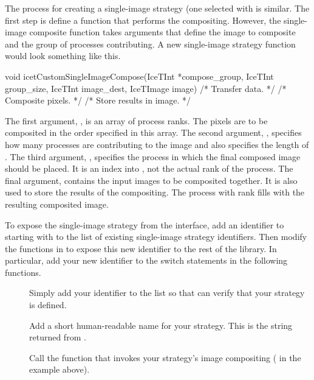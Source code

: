 The process for creating a single-image strategy (one selected with
 is similar.  The first step is define a
function that performs the compositing.  However, the single-image
composite function takes arguments that define the image to composite and
the group of processes contributing.  A new single-image strategy function
would look something like this.

\begin{code}
void icetCustomSingleImageCompose(IceTInt *compose_group, IceTInt group_size,
                                  IceTInt image_dest,
                                  IceTImage image)
{
    /* Transfer data. */
    /* Composite pixels. */
    /* Store results in image. */
}
\end{code}

The first argument, , is an array of process ranks.
The pixels are to be composited in the order specified in this array.  The
second argument, , specifies how many processes are
contributing to the image and also specifies the length of
.  The third argument, , specifies
the process in which the final composed image should be placed.  It is an
index into , not the actual rank of the process.  The
final argument,  contains the input images to be composited
together.  It is also used to store the results of the compositing.  The
process with rank  fills
 with the resulting composited image.

To expose the single-image strategy from the \IceT interface, add an
identifier to  starting with
 to the list of existing
single-image strategy identifiers.  Then modify the functions in
 to expose this new identifier to the rest
of the \IceT library.  In particular, add your new identifier to the switch
statements in the following functions.

\begin{description}
\item[] Simply add your identifier to
  the list so that \IceT can verify that your strategy is defined.
\item[] Add a short
  human-readable name for your strategy.  This is the string returned from
  .
\item[] Call the function that invokes
  your strategy's image compositing (
  in the example above).
\end{description}

